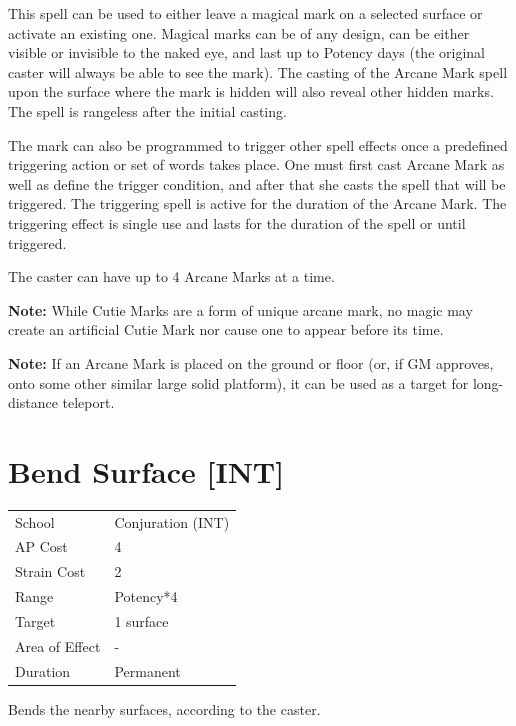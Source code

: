\documentclass[11pt,a4paper,twocolumn]{book}
\begin{document}
This spell can be used to either leave a magical mark on a selected surface or activate an existing one. Magical marks can be of any design, can be either visible or invisible to the naked eye, and last up to Potency days (the original caster will always be able to see the mark). The casting of the Arcane Mark spell upon the surface where the mark is hidden will also reveal other hidden marks. The spell is rangeless after the initial casting.

The mark can also be programmed to trigger other spell effects once a predefined triggering action or set of words takes place. One must first cast Arcane Mark as well as define the trigger condition, and after that she casts the spell that will be triggered. The triggering spell is active for the duration of the Arcane Mark. The triggering effect is single use and lasts for the duration of the spell or until triggered.

The caster can have up to 4 Arcane Marks at a time.
 
\textbf{Note:} While Cutie Marks are a form of unique arcane mark, no magic may create an artificial Cutie Mark nor cause one to appear before its time.

\textbf{Note:} If an Arcane Mark is placed on the ground or floor (or, if GM approves, onto some other similar large solid platform), it can be used as a target for long-distance teleport.


\section*{Bend Surface [INT]}
{
	\begin{tabu} to 75mm{| X[l,4] | X[l,7] |}
		\hline
		School 			& Conjuration (INT) 	\\
        AP Cost	      	& 4 					\\
        Strain Cost     & 2 					\\
        Range     		& Potency*4				\\
        Target      	& 1 surface 			\\
        Area of Effect  & - 	 				\\
        Duration     	& Permanent				\\ \hline
	\end{tabu}
		
}

\medskip

Bends the nearby surfaces, according to the caster.
\end{document}
